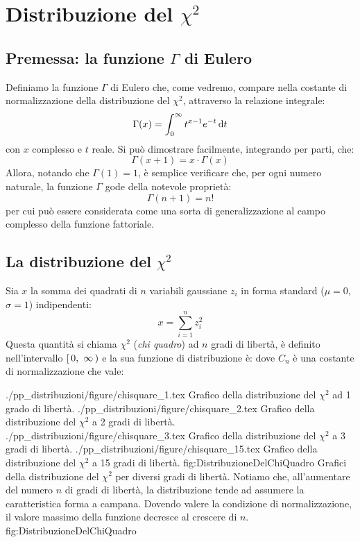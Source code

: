\section{Distribuzione del \texorpdfstring{$\chi^2$}{chi2}}
\label{sec:chiquadro}

\subsection{Premessa: la funzione \texorpdfstring{$\Gamma$}{gamma} di Eulero}

Definiamo la funzione $\Gamma$ di Eulero che, come vedremo, compare nella
costante di normalizzazione della distribuzione del $\chi^2$, attraverso la
relazione integrale:
$$
\Gamma(x) = \dintegral{t^{x-1} e^{-t}}{t}{0}{\infty}
$$
con $x$ complesso e $t$ reale.
Si pu\`o dimostrare facilmente, integrando per parti, che:
$$
\Gamma(x+1) = x \cdot \Gamma(x) 
$$
Allora, notando che $\Gamma(1) = 1$, \`e semplice verificare che, per ogni
numero naturale, la funzione $\Gamma$ gode della notevole propriet\`a:
$$
\Gamma(n+1) = n!
$$
per cui pu\`o essere considerata come una sorta di generalizzazione al campo
complesso della funzione fattoriale.


\subsection{La distribuzione del \texorpdfstring{$\chi^2$}{chi2}}

Sia $x$ la somma dei quadrati di $n$ variabili gaussiane $z_i$ in forma
standard ($\mu=0$, $\sigma=1$) indipendenti:
$$
x = \sum_{i=1}^n z_i^2
$$
Questa quantit\`a si chiama $\chi^2$ (\emph{chi quadro}) ad $n$ gradi di
libert\`a, \`e definito nell'intervallo $\linterval{0}{\infty}$ e la sua
funzione di distribuzione \`e:
dove $C_n$ \`e una costante di normalizzazione che vale:

\panelfig
{\twobytwotexfig
{./pp_distribuzioni/figure/chisquare_1.tex}
{Grafico della distribuzione del $\chi^2$ ad 1 grado di libert\`a.}
{./pp_distribuzioni/figure/chisquare_2.tex}
{Grafico della distribuzione del $\chi^2$ a 2 gradi di libert\`a.}
{./pp_distribuzioni/figure/chisquare_3.tex}
{Grafico della distribuzione del $\chi^2$ a 3 gradi di libert\`a.}
{./pp_distribuzioni/figure/chisquare_15.tex}
{Grafico della distribuzione del $\chi^2$ a 15 gradi di libert\`a.}
{fig:DistribuzioneDelChiQuadro}}
{Grafici della distribuzione del $\chi^2$ per diversi gradi di libert\`a.
Notiamo che, all'aumentare del numero $n$ di gradi di libert\`a, la
distribuzione tende ad assumere la caratteristica forma a campana.
Dovendo valere la condizione di normalizzazione, il valore massimo della
funzione decresce al crescere di $n$.}
{fig:DistribuzioneDelChiQuadro}

